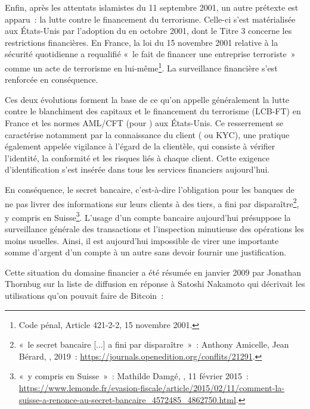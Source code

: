Enfin, après les attentats islamistes du 11 septembre 2001, un autre prétexte est apparu~: la lutte contre le financement du terrorisme. Celle-ci s'est matérialisée aux États-Unis par l'adoption du  en octobre 2001, dont le Titre 3 concerne les restrictions financières. En France, la loi du 15 novembre 2001 relative à la sécurité quotidienne a requalifié «~le fait de financer une entreprise terroriste~» comme un acte de terrorisme en lui-même\footnote{Code pénal, Article 421-2-2, 15 novembre 2001.}. La surveillance financière s'est renforcée en conséquence. %

Ces deux évolutions forment la base de ce qu'on appelle généralement la lutte contre le blanchiment des capitaux et le financement du terrorisme (LCB-FT) en France et les normes AML/CFT (pour ) aux États-Unis. Ce resserrement se caractérise notamment par la connaissance du client ( ou KYC), une pratique également appelée vigilance à l'égard de la clientèle, qui consiste à vérifier l'identité, la conformité et les risques liés à chaque client. Cette exigence d'identification s'est insérée dans tous les services financiers aujourd'hui.

En conséquence, le secret bancaire, c'est-à-dire l'obligation pour les banques de ne pas livrer des informations sur leurs clients à des tiers, a fini par disparaître\footnote{«~le secret bancaire [...] a fini par disparaître~»~: Anthony Amicelle, Jean Bérard, , 2019~: \url{https://journals.openedition.org/conflits/21291}.}, y compris en Suisse\footnote{«~y compris en Suisse~»~: Mathilde Damgé, , 11 février 2015~: \url{https://www.lemonde.fr/evasion-fiscale/article/2015/02/11/comment-la-suisse-a-renonce-au-secret-bancaire_4572485_4862750.html}.}. L'usage d'un compte bancaire aujourd'hui présuppose la surveillance générale des transactions et l'inspection minutieuse des opérations les moins usuelles. Ainsi, il est aujourd'hui impossible de virer une importante somme d'argent d'un compte à un autre sans devoir fournir une justification.

Cette situation du domaine financier a été résumée en janvier 2009 par Jonathan Thornbug sur la liste de diffusion en réponse à Satoshi Nakamoto qui décrivait les utilisations qu'on pouvait faire de Bitcoin~:

